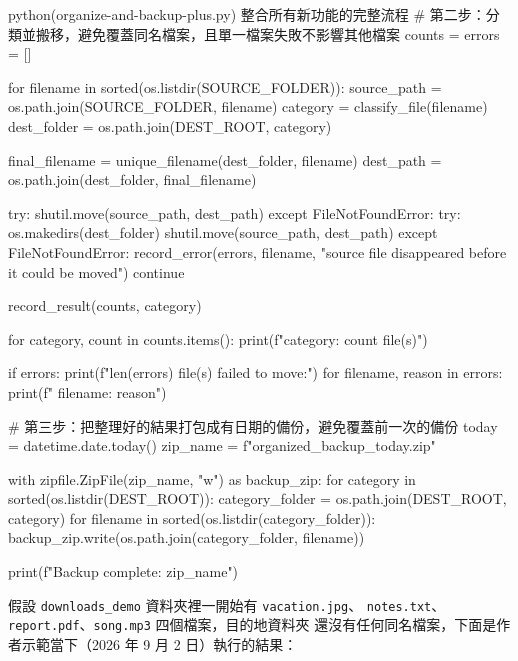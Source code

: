 \begin{example}{python}{(organize-and-backup-plus.py) 整合所有新功能的完整流程}
# 第二步：分類並搬移，避免覆蓋同名檔案，且單一檔案失敗不影響其他檔案
counts = {}
errors = []

for filename in sorted(os.listdir(SOURCE_FOLDER)):
    source_path = os.path.join(SOURCE_FOLDER, filename)
    category = classify_file(filename)
    dest_folder = os.path.join(DEST_ROOT, category)

    final_filename = unique_filename(dest_folder, filename)
    dest_path = os.path.join(dest_folder, final_filename)

    try:
        shutil.move(source_path, dest_path)
    except FileNotFoundError:
        try:
            os.makedirs(dest_folder)
            shutil.move(source_path, dest_path)
        except FileNotFoundError:
            record_error(errors, filename, "source file disappeared before it could be moved")
            continue

    record_result(counts, category)

for category, count in counts.items():
    print(f"{category}: {count} file(s)")

if errors:
    print(f"{len(errors)} file(s) failed to move:")
    for filename, reason in errors:
        print(f"  {filename}: {reason}")

# 第三步：把整理好的結果打包成有日期的備份，避免覆蓋前一次的備份
today = datetime.date.today()
zip_name = f"organized_backup_{today}.zip"

with zipfile.ZipFile(zip_name, "w") as backup_zip:
    for category in sorted(os.listdir(DEST_ROOT)):
        category_folder = os.path.join(DEST_ROOT, category)
        for filename in sorted(os.listdir(category_folder)):
            backup_zip.write(os.path.join(category_folder, filename))

print(f"Backup complete: {zip_name}")
\end{example}

假設 \texttt{downloads\_demo} 資料夾裡一開始有 \texttt{vacation.jpg}、
\texttt{notes.txt}、\texttt{report.pdf}、\texttt{song.mp3} 四個檔案，目的地資料夾
還沒有任何同名檔案，下面是作者示範當下（2026 年 9 月 2 日）執行的結果：


